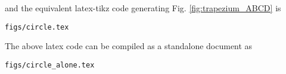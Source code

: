 \begin{enumerate}[label=\thesection.\arabic*.,ref=\thesection.\theenumi]
%
and the equivalent latex-tikz code generating Fig. \ref{fig:trapezium_ABCD} is 
\begin{lstlisting}
figs/circle.tex
\end{lstlisting}
%
The above latex code can be compiled as a standalone document as
\begin{lstlisting}
figs/circle_alone.tex
\end{lstlisting}

%

\end{enumerate}
